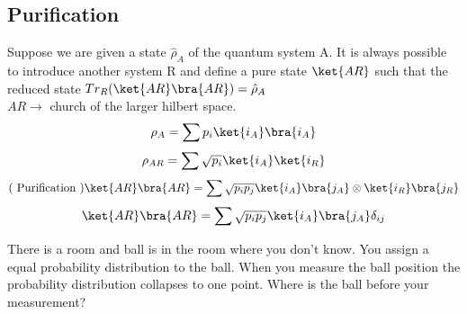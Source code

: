 \subsection{Purification}
Suppose we are given a state \(\hat{\rho} _A\) of the quantum system A.
It is always possible to introduce another system R and define a pure state \(\ket{AR}\) such that the reduced state \(Tr_R(\ket{AR}\bra{AR}) = \hat{\rho} _A\)\\ \(AR\to \)  church of the larger hilbert space. 
\[
    \rho_A = \sum p_i \ket{i_A}\bra{i_A}
\]
\[
    \rho_{AR} = \sum \sqrt{p_i}\ket{i_A}\ket{i_R} 
\]
\[
    (\text{ Purification })\ket{AR}\bra{AR} = \sum \sqrt{p_{i} p_j} \ket{i_A}\bra{j_A}\otimes \ket{i_R}\bra{j_R}
\]
\[
    \ket{AR}\bra{AR} = \sum \sqrt{p_{i} p_j} \ket{i_A}\bra{j_A}\delta_{ij}  
\]
\begin{eg}
    There is a room and ball is in the room where you don't know. You assign a equal probability distribution to the ball. When you measure the ball position the probability distribution collapses to one point. Where is the ball before your measurement?
\end{eg}
